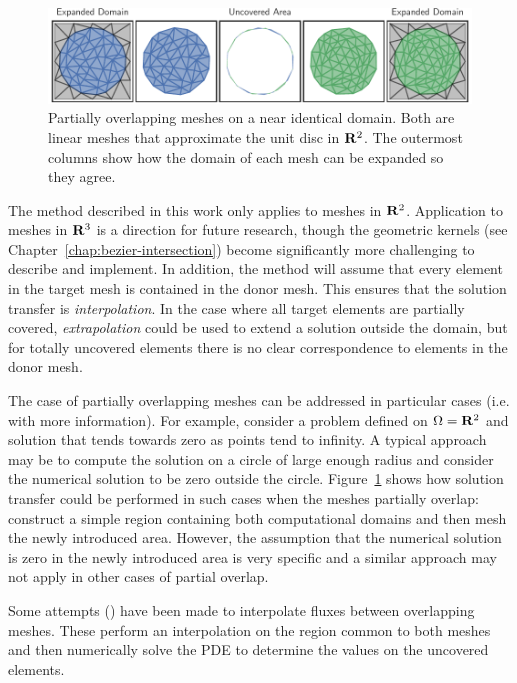 \begin{figure}
  \includegraphics{../images/solution-transfer/main_figure29.pdf}
  \centering
  \captionsetup{width=.75\linewidth}
  \caption{Partially overlapping meshes on a near identical domain. Both are
    linear meshes that approximate the unit disc in \(\mathbf{R}^2\). The outermost
    columns show how the domain of each mesh can be expanded so they agree.}
  \label{fig:partially-overlapping}
\end{figure}

The method described in this work only applies to meshes in \(\mathbf{R}^2\).
Application to meshes in \(\mathbf{R}^3\) is a direction for future research,
though the geometric kernels (see Chapter~\ref{chap:bezier-intersection})
become significantly more challenging to describe and implement. In
addition, the method will assume that every element in the
target mesh is contained in the donor mesh. This ensures that the solution
transfer is \textit{interpolation}. In the case where all target elements are
partially covered, \textit{extrapolation} could be used to extend a solution
outside the domain, but for totally uncovered elements there is no clear
correspondence to elements in the donor mesh.

The case of partially overlapping meshes can be addressed in particular
cases (i.e. with more information). For example, consider a problem
defined on \(\Omega = \mathbf{R}^2\) and solution
that tends towards zero as points tend to infinity. A typical approach
may be to compute the solution on a circle of large enough radius and
consider the numerical solution to be zero outside the circle.
Figure~\ref{fig:partially-overlapping} shows how solution transfer could be
performed in such cases when the meshes partially overlap: construct a
simple region containing both computational domains and then mesh the
newly introduced area. However, the assumption that the numerical solution
is zero in the newly introduced area is very specific and
a similar approach may not apply in other cases of partial overlap.

Some attempts (\cite{Berger1987, Chesshire1994, Cai1999}) have been
made to interpolate fluxes between overlapping meshes. These perform
an interpolation on the region common to both meshes and then numerically
solve the PDE to determine the values on the uncovered elements.

